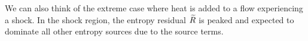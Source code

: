 %
\begin{remark}
We can also think of the extreme case where heat is added to a flow experiencing a shock. In the shock region, the entropy residual $\widetilde{R}$ is peaked and expected to dominate all other entropy sources due to the source terms. 
\end{remark}
